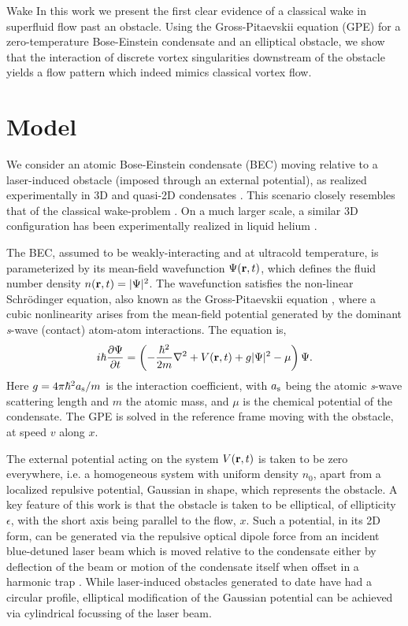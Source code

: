 \begin{chapter}{\label{cha:wake}Wake}
In this work we present the first clear
evidence of a classical wake in superfluid flow past an obstacle. Using
the Gross-Pitaevskii equation (GPE) for a zero-temperature Bose-Einstein condensate and an elliptical obstacle, we 
show that the interaction of  
discrete vortex singularities downstream of the
obstacle yields a flow pattern which indeed mimics classical vortex flow.


\section{Model}

We consider an atomic Bose-Einstein condensate (BEC) moving relative to a laser-induced obstacle (imposed through 
an external potential), as realized experimentally in 3D \cite{Raman,Onofrio,Inouye,Neely} and quasi-2D condensates \cite{Neely}.  This scenario closely resembles that of the classical wake-problem \cite{taneda41,taneda112}.  On a much larger scale, a similar 
3D configuration has been experimentally realized in liquid helium 
\cite{VanSciver1999,VanSciver2005}.

The BEC, assumed to be weakly-interacting and at ultracold temperature, is parameterized by its mean-field wavefunction $\Psi({\bf r},t)$, which defines the fluid number density $n({\bf r}, t)=|\Psi|^2$.  The wavefunction satisfies the non-linear Schr{\"o}dinger equation, also known as the Gross-Pitaevskii equation \cite{Pethick}, where a cubic nonlinearity arises from the mean-field potential generated by the dominant {\it s}-wave (contact) atom-atom interactions. The equation is,  
\begin{equation}
i \hbar \frac{\partial\Psi}{\partial t} = \left(-\frac{\hbar^2}{2m}\nabla^2 + V({\bf r},t) + g|\Psi|^2 - \mu \right) \Psi.
\label{eq:gpe1}
\end{equation} 
Here $g=4 \pi \hbar^2 a_{\rm s}/m$ is the interaction coefficient, with $a_{\rm s}$ being the atomic {\it s}-wave scattering length and $m$ the atomic mass, and $\mu$ is the chemical potential of the condensate.  The GPE is solved in the reference frame moving with the obstacle, at speed $v$ along $x$.  

The external potential acting on the system $V({\bf r}, t)$ is taken to be zero everywhere, i.e. a homogeneous system with uniform density $n_0$, apart from a localized repulsive potential, Gaussian in shape, which represents the obstacle.  A key feature of this work is that the obstacle is taken to be elliptical, of ellipticity $\epsilon$, with the short axis being parallel to the flow, $x$.    Such a potential, in its 2D form, can be generated via the repulsive optical dipole force from an incident blue-detuned laser beam which is moved relative to the condensate either by deflection of the beam \cite{Raman,Onofrio,Inouye} or motion of the condensate itself when offset in a harmonic trap \cite{Neely}.  While laser-induced obstacles generated to date have had a circular profile, elliptical modification of the Gaussian potential can be achieved via cylindrical focussing of the laser beam.   



\end{chapter}
